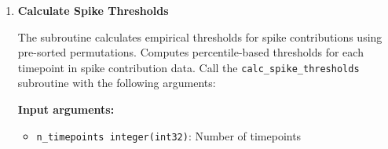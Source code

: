 \documentclass[11pt]{article}
\begin{document}
\begin{enumerate}
\begin{enumerate}
\begin{enumerate}
	      	      	      \textbf{Input arguments:}
	      	      	      \begin{itemize}
	      	      	      	\item \texttt{n\_samples integer(int32)}: Number of samples
	      	      	      	      
	      	      	      	\item \texttt{contributions real(real64)}: Array of integrated contributions
	      	      	      	      (size: \texttt{n\_samples})
	      	      	      	      
	      	      	      	\item \texttt{threshold real(real64)}: Scalar threshold value for
	      	      	      	      outlier detection
	      	      	      \end{itemize}
	      	      	      \textbf{Output arguments:}
	      	      	      \begin{itemize}
	      	      	      	\item \texttt{outlier\_mask logical}: 1D logical array indicating
	      	      	      	      outliers (size: \texttt{n\_samples})
	      	      	      	      
	      	      	      	\item \texttt{ierr integer(int32)}: Error code (for error
	      	      	      	      details please check
	      	      	      	      \hyperref[sec:error-handling]{error handling section})
	      	      	      \end{itemize}
	      	      	      \begin{lstlisting}[language=Fortran, caption={Integrated Outlier Detection}]
call detect_outliers_integrated(contributions, n_samples,&
                                threshold, outlier_mask, ierr)
	      	      	      \end{lstlisting}
	      	      	      
	      	      	\item \textbf{Calculate Spike Thresholds}
	      	      	      
	      	      	      The subroutine calculates empirical thresholds for spike contributions
	      	      	      using pre-sorted permutations. Computes percentile-based
	      	      	      thresholds for each timepoint in spike contribution data. Call the
	      	      	      \texttt{calc\_spike\_thresholds} subroutine with the following
	      	      	      arguments:
	      	      	      
	      	      	      \textbf{Input arguments:}
	      	      	      \begin{itemize}
	      	      	      	\item \texttt{n\_timepoints integer(int32)}: Number of timepoints
	      	      	      	      

\end{itemize}
\end{enumerate}
\end{enumerate}
\end{enumerate}
\end{document}
